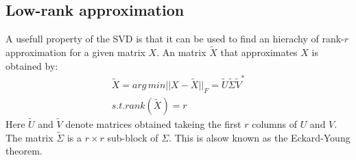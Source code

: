 \subsection{Low-rank approximation}
A usefull property of the SVD is that it can be used to find an hierachy of rank-\(r\) approximation for a given matrix \(X\).
An matrix \(\tilde{X}\) that approximates \(X\) is obtained by:
\begin{gather}
\tilde{X} = arg\,min ||X - \tilde{X}||_F = \tilde{U}\tilde{\Sigma}\tilde{V}^{*}	\\
s.t. rank(\tilde{X}) = r
\end{gather}	
Here  \(\tilde{U}\) and \(\tilde{V}\) denote matrices obtained takeing the first \(r\) columns of \(U\) and \(V\). The matrix \(\tilde{\Sigma}\) is a \(r \times r\) sub-block of \(\Sigma\).
This is alsow known as the Eckard-Young theorem.
\cite{brunton_kutz_2019}




